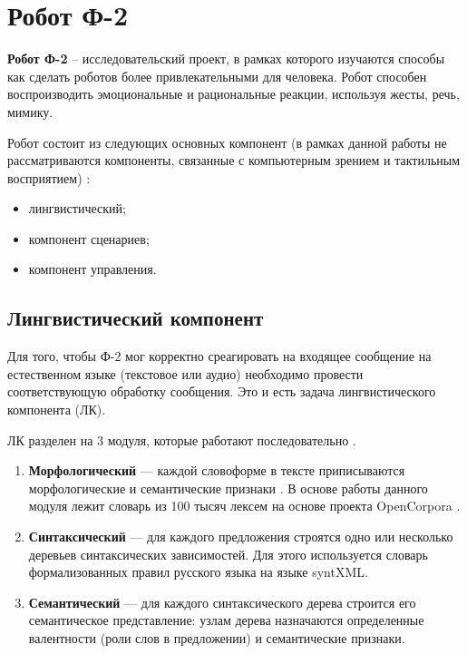 \chapter{Робот Ф-2}

\textbf{Робот Ф-2} -- исследовательский проект, в рамках которого изучаются способы как сделать роботов более привлекательными для человека. Робот способен воспроизводить эмоциональные и рациональные реакции, используя жесты, речь, мимику. 

Робот состоит из следующих основных компонент (в рамках данной работы не рассматриваются компоненты, связанные с компьютерным зрением и тактильным восприятием) \cite{arch_of_the_robot}:

\begin{itemize}
	\item лингвистический;
	\item компонент сценариев;
	\item компонент управления.
\end{itemize}




\section{Лингвистический компонент}

Для того, чтобы Ф-2 мог корректно среагировать на входящее сообщение на естественном языке (текстовое или аудио) необходимо провести соответствующую обработку сообщения. Это и есть задача лингвистического компонента (ЛК).

ЛК разделен на 3 модуля, которые работают последовательно \cite{arch_of_the_robot}. 

\begin{enumerate}
	\item \textbf{Морфологический} --- каждой словоформе в тексте приписываются морфологические и семантические признаки \cite{arch_of_the_robot_2}. В основе работы данного модуля лежит словарь из 100 тысяч лексем на основе проекта OpenCorpora \cite{arch_of_the_robot_3}.
	
	\item \textbf{Синтаксический} --- для каждого предложения строятся одно или несколько деревьев синтаксических зависимостей. Для этого используется словарь формализованных правил русского языка на языке syntXML.
	
	\item \textbf{Семантический} --- для каждого синтаксического дерева строится его семантическое представление: узлам дерева назначаются определенные валентности (роли слов в предложении) и семантические признаки. %
\end{enumerate}


